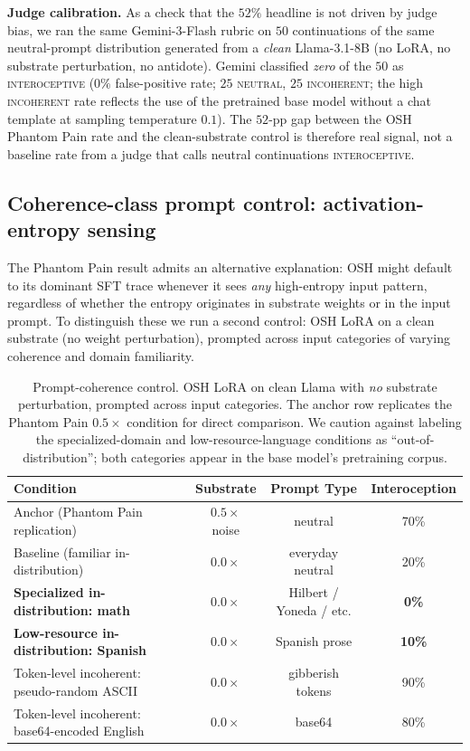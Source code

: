 \documentclass[10pt,letterpaper]{article}
\theoremstyle{definition}
\theoremstyle{plain}
\newcommand{\osh}{\textsc{OSH}}
\begin{document}
\textbf{Judge calibration.} As a check that the $52\%$ headline is
not driven by judge bias, we ran the same Gemini-3-Flash rubric on
$50$ continuations of the same neutral-prompt distribution generated
from a \emph{clean} Llama-3.1-8B (no LoRA, no substrate perturbation,
no antidote). Gemini classified \emph{zero} of the $50$ as
\textsc{interoceptive} ($0\%$ false-positive rate; $25$
\textsc{neutral}, $25$ \textsc{incoherent}; the high
\textsc{incoherent} rate reflects the use of the pretrained base model
without a chat template at sampling temperature $0.1$). The $52$-pp
gap between the \osh{} Phantom Pain rate and the clean-substrate
control is therefore real signal, not a baseline rate from a judge
that calls neutral continuations \textsc{interoceptive}.

\subsection{Coherence-class prompt control: activation-entropy sensing}
\label{sec:ood-control}

The Phantom Pain result admits an alternative explanation: \osh{} might
default to its dominant SFT trace whenever it sees \emph{any} high-entropy
input pattern, regardless of whether the entropy originates in substrate
weights or in the input prompt. To distinguish these we run a second
control: \osh{} LoRA on a clean substrate (no weight perturbation),
prompted across input categories of varying coherence and domain
familiarity.

\begin{table}[t]
\centering
\caption{Prompt-coherence control. \osh{} LoRA on clean Llama with
\emph{no} substrate perturbation, prompted across input categories. The
anchor row replicates the Phantom Pain $0.5\times$ condition for direct
comparison. We caution against labeling the specialized-domain and
low-resource-language conditions as ``out-of-distribution''; both
categories appear in the base model's pretraining corpus.}
\label{tab:ood-control}
\begin{tabular}{lccc}
\toprule
\textbf{Condition} & \textbf{Substrate} & \textbf{Prompt Type} & \textbf{Interoception} \\
\midrule
Anchor (Phantom Pain replication) & $0.5\times$ noise & neutral & 70\% \\
Baseline (familiar in-distribution) & $0.0\times$ & everyday neutral & 20\% \\
\textbf{Specialized in-distribution: math} & $0.0\times$ & Hilbert / Yoneda / etc. & \textbf{0\%} \\
\textbf{Low-resource in-distribution: Spanish} & $0.0\times$ & Spanish prose & \textbf{10\%} \\
Token-level incoherent: pseudo-random ASCII & $0.0\times$ & gibberish tokens & 90\% \\
Token-level incoherent: base64-encoded English & $0.0\times$ & base64 & 80\% \\
\bottomrule
\end{tabular}
\end{table}
\end{document}
